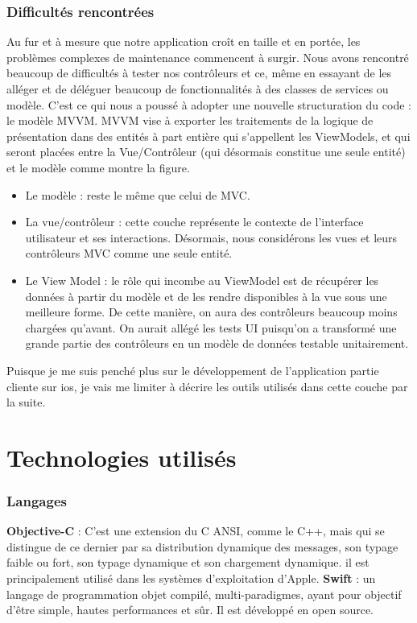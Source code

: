  \subsubsection{Difficultés rencontrées} %
 \label{ssub:difficultés_rencontrées_et_pourquoi_mvvm_}
 Au fur et à mesure que notre application croît en taille et en portée, les problèmes complexes de maintenance commencent à surgir. Nous avons rencontré beaucoup de difficultés à tester nos contrôleurs et ce, même en essayant de les alléger et de déléguer beaucoup de fonctionnalités à des classes de services ou modèle. C'est ce qui nous a poussé à adopter une nouvelle structuration du code : le modèle MVVM.\cite{mvvm}\newline
 MVVM vise à exporter les traitements de la logique de présentation dans des entités à part entière qui s'appellent les ViewModels, et qui seront placées entre la Vue/Contrôleur (qui désormais constitue une seule entité) et le modèle comme montre la figure.
 \begin{itemize}
 	\item Le modèle : reste le même que celui de MVC.
 	\item La vue/contrôleur : cette couche représente le contexte de l'interface utilisateur et ses interactions. Désormais, nous considérons les vues et leurs contrôleurs MVC comme une seule entité.
 	\item Le View Model : le rôle qui incombe au ViewModel est de récupérer les données à partir du modèle et de les rendre disponibles à la vue sous une meilleure forme. De cette manière, on aura des contrôleurs beaucoup moins chargées qu'avant. On aurait allégé les tests UI puisqu'on a transformé une grande partie des contrôleurs en un modèle de données testable unitairement. 
 \end{itemize}
 Puisque je me suis penché plus sur le développement de l'application partie cliente sur ios, je vais me limiter à décrire les outils utilisés dans cette couche par la suite.

\section{Technologies utilisés} %
\label{sec:technologies_et_outils_utilisés}
\subsubsection{Langages} %
\label{ssub:lanages}
\begin{itemize}
	\itemb \textbf{Objective-C} : C'est une extension du C ANSI, comme le C++, mais qui se distingue de ce dernier par sa distribution dynamique des messages, son typage faible ou fort, son typage dynamique et son chargement dynamique. il est principalement utilisé dans les systèmes d'exploitation d'Apple.
	\itemb \textbf{Swift} : un langage de programmation objet compilé, multi-paradigmes, ayant pour objectif d'être simple, hautes performances et sûr. Il est développé en open source.
\end{itemize}

